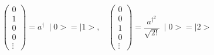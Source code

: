\begin{equation}
\left(
\begin{array}{c}
0 \\
1 \\
0 \\
0 \\
\vdots
\end{array}
\right)= a^{\dag}~\mid 0>=\mid 1>,~~~~\left(
\begin{array}{c}
0 \\
0 \\
1 \\
0 \\
\vdots
\end{array}
\right)= \frac{a^{\dag^{2}}}{\sqrt{2!}}~\mid 0> = \mid 2>
\end{equation}

